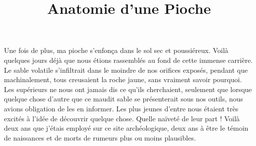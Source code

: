 \documentclass[12pt,a4paper,article]{memoir} %
\title{Anatomie d'une Pioche}
\author{}
\date{} %
\begin{document}
\maketitle

Une fois de plus, ma pioche s'enfon\c{c}a dans le sol sec et poussi\'{e}reux. Voil\`{a} quelques jours d\'{e}j\`{a} que nous \'{e}tions rassembl\'{e}s au fond de cette immense carri\`{e}re. Le sable volatile s'infiltrait dans le moindre de nos orifices expos\'{e}s, pendant que machinalement, tous creusaient la roche jaune, sans vraiment savoir pourquoi. Les sup\'{e}rieurs ne nous ont jamais dis ce qu'ils cherchaient, seulement que lorsque quelque chose d'autre que ce maudit sable se pr\'{e}senterait sous nos outils, nous avions obligation de les en informer. Les plus jeunes d'entre nous \'{e}taient tr\`{e}s excit\'{e}s \`{a} l'id\'{e}e de d\'{e}couvrir quelque chose. Quelle na\"{i}vet\'{e} de leur part ! Voil\`{a} deux ans que j'\'{e}tais employ\'{e} sur ce site arch\'{e}ologique, deux ans \`{a} \^{e}tre le t\'{e}moin de naissances et de morts de rumeurs plus ou moins plausibles.
\end{document}
